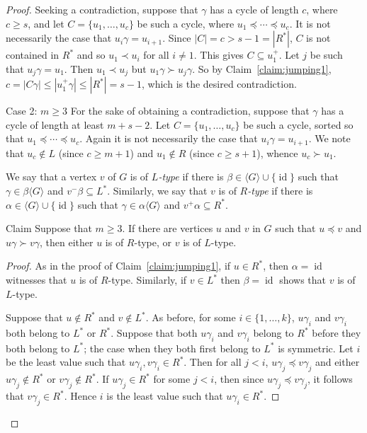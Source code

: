 \documentclass[ALCO,ThmDefs,Unicode,epreuves]{cedram}
\DeclareMathOperator{\id}{id}
\newcommand{\genset}[1]{\langle#1\rangle}
\newenvironment{claim}{\begin{enonce}{Claim}}{\end{enonce}}
\begin{document}
\begin{proof}
Seeking a contradiction, suppose that $\gamma$ has
a cycle of length $c$, where $c \geq s$, and let $C = \{u_1, \dots, u_c\}$
be such a cycle, where $u_1 \preceq\cdots\preceq u_c$. It is
not necessarily the case that $u_i \gamma = u_{i+1}$. Since $|C| = c > s - 1 =
|R ^ *|$, $C$ is not contained in $R^*$ and so $u_1 \prec u_i$ for all $i \ne 1$. 
%
This gives $C\subseteq u_1^+$.
%
Let $j$ be such that $u_j\gamma=u_1$. Then $u_1\prec u_j$ but $u_1\gamma\succ u_j\gamma$.
%
So by Claim~\ref{claim:jumping1}, $c = |C \gamma|
\le |u_1^+ \gamma| \le |R^*|=s-1$, which is the desired contradiction. 

\begin{enonce*}[remark]{Case 2: ${m \geq 3}$}
For the sake of obtaining a contradiction, suppose that $\gamma$ has a cycle of length at least $m + s - 2$. Let $C =
\{u_1, \dots, u_c\}$ be such a cycle, sorted so
that $u_1 \preceq \cdots\preceq u_c$. Again it is not
necessarily the case that $u_i \gamma = u_{i+1}$. We note that $u_c \notin L$
(since $c \ge m+1$) and $u_1 \notin R$ (since $c \ge s+1$), whence $u_c \succ
u_1$. 

We say that a vertex $v$ of $G$ is of
\emph{$L$-type} if there is $\beta \in \genset{G} \cup \{ \id \}$ such that
$\gamma \in \beta \genset{G}$ and $v^- \beta \subseteq L^*$. Similarly, we
say that $v$ is of \emph{$R$-type} if there is $\alpha \in \genset{G} \cup
\{ \id \}$ such that $\gamma \in \alpha \genset{G}$ and $v^+ \alpha \subseteq
R^*$. 
\end{enonce*}

\begin{claim} \label{claim:jumping2}
 Suppose that $m\ge 3$. If there are vertices $u$ and $v$ in $G$ such that
 $u\preceq v$ and $u\gamma \succ v\gamma$, then either
 $u$ is of $R$-type, or $v$ is of $L$-type.
\end{claim}
\begin{proof} 
 As in the proof of Claim~\ref{claim:jumping1}, if $u \in R^*$, then 
 $\alpha = \id$ witnesses that $u$ is of $R$-type. Similarly, if 
 $v \in L^*$ then $\beta = \id$ shows that $v$ is of $L$-type. 
 
 Suppose that $u \notin R^*$ and $v \notin L^*$. As before, for some $i\in
 \{1, \ldots, k\}$, $u\gamma_i$ and $v\gamma_i$ both belong to $L^*$ or
 $R^*$. Suppose that both $u\gamma_i$ and $v\gamma_i$ belong to $R^ *$ before
 they both belong to $L ^ *$; the case when they both first belong to $L^*$ is
 symmetric. Let $i$ be the least value such that $u\gamma_i, v\gamma_i\in R ^
 *$. Then for all $j < i$, $u\gamma_j \preceq v\gamma_j$ and either
 $u\gamma_j \notin R^*$ or $v\gamma_j \notin R^*$. If $u\gamma_j \in R ^*$
 for some $j < i$, then since $u\gamma_j\preceq v\gamma_j$, it follows that
 $v\gamma_j \in R ^*$. Hence $i$ is the least value such that $u\gamma_i\in
 R ^ *$.


\end{proof}
\end{proof}
\end{document}
